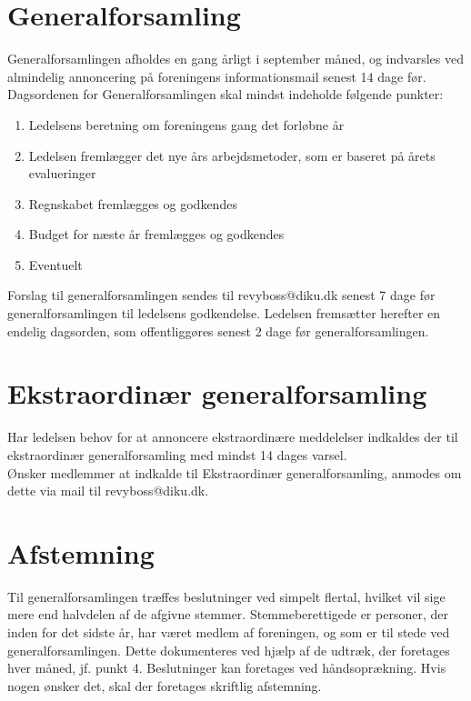 \documentclass[a4paper,11pt,danish]{article}
\begin{document}
\section{Generalforsamling}
Generalforsamlingen afholdes en gang årligt i september måned, og indvarsles ved almindelig annoncering på foreningens informationsmail senest 14 dage før. \\

\noindent Dagsordenen for Generalforsamlingen skal mindst indeholde følgende punkter: 

\begin{enumerate}
\item Ledelsens beretning om foreningens gang det forløbne år
\item Ledelsen fremlægger det nye års arbejdsmetoder, som er baseret på årets evalueringer
\item Regnskabet fremlægges og godkendes
\item Budget for næste år fremlægges og godkendes
\item Eventuelt
\end{enumerate}

\noindent Forslag til generalforsamlingen sendes til revyboss@diku.dk senest 7 dage før generalforsamlingen til ledelsens godkendelse. Ledelsen fremsætter herefter en endelig dagsorden, som offentliggøres senest 2 dage før generalforsamlingen. 

\section{Ekstraordinær generalforsamling}
Har ledelsen behov for at annoncere ekstraordinære meddelelser indkaldes der til ekstraordinær generalforsamling med mindst 14 dages varsel. \\

\noindent Ønsker medlemmer at indkalde til Ekstraordinær generalforsamling, anmodes om dette via mail til revyboss@diku.dk.

\section{Afstemning}
Til generalforsamlingen træffes beslutninger ved simpelt flertal, hvilket vil sige mere end halvdelen af de afgivne stemmer. Stemmeberettigede er personer, der inden for det sidste år, har været medlem af foreningen, og som er til stede ved generalforsamlingen. Dette dokumenteres ved hjælp af de udtræk, der foretages hver måned, jf. punkt 4. Beslutninger kan foretages ved håndsoprækning. Hvis nogen ønsker det, skal der foretages skriftlig afstemning.
\end{document}
